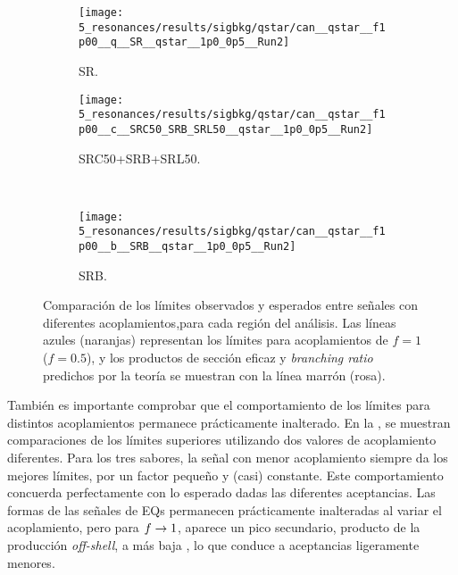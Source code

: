 \begin{figure}[ht!]
    \centering
    \begin{subfigure}[t]{0.49\linewidth}
        \centering
        \texttt{[image: 5\_resonances/results/sigbkg/qstar/can\_\_qstar\_\_f1p00\_\_q\_\_SR\_\_qstar\_\_1p0\_0p5\_\_Run2]}
        \caption{SR.}
        \label{fig:results:results:bkgsig:results:qstar:limits_couplings_comparison:SR}
    \end{subfigure}
    \hfill
    \begin{subfigure}[t]{0.49\linewidth}
        \centering
        \texttt{[image: 5\_resonances/results/sigbkg/qstar/can\_\_qstar\_\_f1p00\_\_c\_\_SRC50\_SRB\_SRL50\_\_qstar\_\_1p0\_0p5\_\_Run2]}
        \caption{SRC50+SRB+SRL50.}
        \label{fig:results:results:bkgsig:results:qstar:limits_couplings_comparison:SRC}
    \end{subfigure}\\
    \begin{subfigure}[t]{0.49\linewidth}
        \centering
        \texttt{[image: 5\_resonances/results/sigbkg/qstar/can\_\_qstar\_\_f1p00\_\_b\_\_SRB\_\_qstar\_\_1p0\_0p5\_\_Run2]}
        \caption{SRB.}
        \label{fig:results:results:bkgsig:results:qstar:limits_couplings_comparison:SRB}
    \end{subfigure}
    \caption{Comparación de los límites observados y esperados entre señales con diferentes acoplamientos,para cada región del análisis. Las líneas azules (naranjas) representan los límites para acoplamientos de \(f=1\) (\(f=0.5\)), y los productos de sección eficaz y \textit{branching ratio} predichos por la teoría se muestran con la línea marrón (rosa).}
    \label{fig:results:results:bkgsig:results:qstar:limits_couplings_comparison}
\end{figure}

También es importante comprobar que el comportamiento de los límites para distintos acoplamientos permanece prácticamente inalterado. En la \Fig{\ref{fig:results:results:bkgsig:results:qstar:limits_couplings_comparison}}, se muestran comparaciones de los límites superiores utilizando dos valores de acoplamiento diferentes. Para los tres sabores, la señal con menor acoplamiento siempre da los mejores límites, por un factor pequeño y (casi) constante. Este comportamiento concuerda perfectamente con lo esperado dadas las diferentes aceptancias. Las formas de las señales de \acp{EQ} permanecen prácticamente inalteradas al variar el acoplamiento, pero para \(f\rightarrow 1\), aparece un pico secundario, producto de la producción \textit{off-shell}, a más baja \myj, lo que conduce a aceptancias ligeramente menores.


